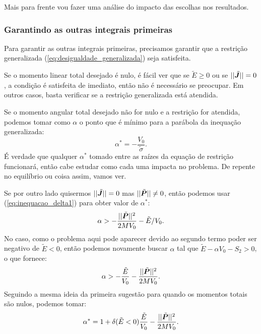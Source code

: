 Mais para frente vou fazer uma análise do impacto das escolhas nos resultados.


\subsubsection{Garantindo as outras integrais primeiras}
Para garantir as outras integrais primeiras, precisamos garantir que a restrição generalizada (\ref{eq:desigualdade_generalizada}) seja satisfeita.

Se o momento linear total desejado é nulo, é fácil ver que se $\tilde E \geq 0$ ou se $||\tilde{\bm J}|| = 0$, a condição é satisfeita de imediato, então não é necessário se preocupar. Em outros casos, basta verificar se a restrição generalizada está atendida.

Se o momento angular total desejado não for nulo e a restrição for atendida, podemos tomar como $\alpha$ o ponto que é mínimo para a parábola da inequação generalizada:
\begin{equation}
    \alpha^* = - \dfrac{V_0}{\tilde \sigma}.
\end{equation}
É verdade que qualquer $\alpha^*$ tomado entre as raízes da equação de restrição funcionará, então cabe estudar como cada uma impacta no problema. De repente no equilíbrio ou coisa assim, vamos ver.

Se por outro lado quisermos $||\tilde{\bm J}|| = 0$ mas $||\tilde{\bm P}|| \neq 0$, então podemos usar (\ref{eq:inequacao_delta1}) para obter valor de $\alpha^*$:
\begin{equation}
    \alpha > -\dfrac{||\tilde{\bm P}||^2}{2M V_0} - \tilde E / V_0.
\end{equation}
No caso, como o problema aqui pode aparecer devido ao segundo termo poder ser negativo de $\tilde E < 0$, então podemos novamente buscar $\alpha$ tal que $\tilde E - \alpha V_0 - S_2 > 0$, o que fornece:
\begin{equation}
    \alpha > -\dfrac{\tilde E}{V_0} - \dfrac{||\tilde{\bm P}||^2}{2 M V_0}.
\end{equation}
Seguindo a mesma ideia da primeira sugestão para quando os momentos totais são nulos, podemos tomar:
\begin{equation}
    \alpha^* = 1 + \delta(\tilde E < 0) \dfrac{\tilde E}{V_0} - \dfrac{||\tilde{\bm P}||^2}{2 M V_0}.
\end{equation}